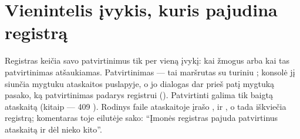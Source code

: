 \section{Vienintelis įvykis, kuris pajudina registrą}\label{sec:register:event}

Registras keičia savo patvirtinimus tik per vieną įvykį: kai žmogus  arba kai tas patvirtinimas atšaukiamas. Patvirtinimas --- tai maršrutas
 su turiniu ; konsolė jį siunčia
mygtuku  ataskaitos puslapyje, o jo dialogas dar prieš patį mygtuką
pasako, ką patvirtinimas padarys registrui
(). Patvirtinti galima tik baigtą ataskaitą (kitaip ---
409 ). Rodinys  faile  ataskaitoje
įrašo ,  ir , o tada iškviečia registrą;
komentaras toje eilutėje sako: \enquote{Įmonės registras pajuda patvirtinus ataskaitą ir dėl nieko
kito}.

